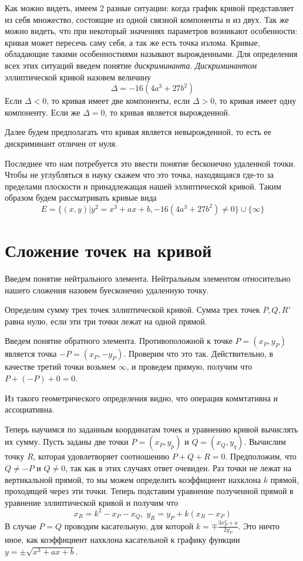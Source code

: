 \documentclass[a4paper,12pt]{article}
\begin{document}
        Как можно видеть, имеем 2 разные ситуации: когда график кривой представляет из себя множество, состоящие из одной связной 
        компоненты и из двух. Так же можно видеть, что при некоторый значениях параметров возникают особенности: кривая может пересечь саму себя,
        а так же есть точка излома. Кривые, обладающие такими особенностиями называют вырожденными. Для определения всех этих ситуаций введем
        понятие \textit{дискриминанта}. \textit{Дискриминантом} эллиптической кривой назовем величину 
        $$
            \Delta = -16(4a^3 + 27b^2)
        $$ 
        Если $\Delta < 0$, то кривая имеет две компоненты, если $\Delta > 0$, то кривая имеет одну компоненту. Если же
        $\Delta = 0$, то кривая является вырожденной.

        Далее будем предполагать что кривая является невырожденной, то есть ее дискриминант отличен от нуля. 

        Последнее что нам потребуется это ввести понятие бесконечно удаленной точки. Чтобы не углубляться в науку скажем что это точка, находящаяся где-то
        за пределами плоскости и принадлежащая нашей эллиптической кривой. Таким образом будем рассматривать кривые вида
        $$
            E = \{(x, y) | y^2 = x^3 + ax + b, -16(4a^3 + 27b^2) \neq 0\} \cup \{\infty\}
        $$

    \section{Сложение точек на кривой}
        Введем понятие нейтрального элемента. Нейтральным элементом относительно нашего сложения назовем буесконечно удаленную точку.

        Определим сумму трех точек эллиптической кривой. Сумма трех точек $P, Q, R'$ равна нулю, если эти три точки лежат
        на одной прямой. 

        Введем понятие обратного элемента. Противоположной к точке $P = (x_P, y_P)$ является точка $-P = (x_P, -y_P)$. Проверим что это так.
        Действительно, в качестве третий точки возьмем $\infty$, и проведем прямую, получим что $P + (-P) + 0 = 0$. 

        Из такого геометрического определения видно, что операция коммтативна и ассоциативна. 

        Теперь научимся по заданным координатам точек и уравнению кривой вычислять их сумму. Пусть заданы две точки $P = (x_P, y_p)$ и
        $Q = (x_Q, y_q)$. Вычислим точку $R$, которая удовлетворяет соотношению $P + Q + R = 0$. Предположим, что $Q \neq -P$ и $Q \neq 0$,
        так как в этих случаях ответ очевиден. Раз точки не лежат на вертикальной прямой, то мы можем определить коэффициент нахклона $k$ прямой,
        проходящей через эти точки. Теперь подставим уравнение полученной прямой в уравнение эллиптической кривой и получим что
        $$
            x_R = k^2 - x_P - x_Q,\;
            y_R = y_P + k(x_R - x_P)
        $$
        В случае $P = Q$ проводим касательную, для которой $k = \mp\frac{3x_P^2 + a}{2y_P}$. Это ничто иное, как коэффициент нахклона
        касательной к графику функции $y = \pm\sqrt{x^3 + ax + b}$.
\end{document}

